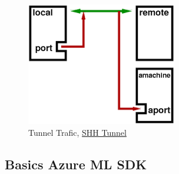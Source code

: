 \begin{figure}[H]
	\centering
	\includegraphics[scale = 0.3]{attachment/chapter_AML/Scc010}
	\caption{Tunnel Trafic, \href{https://radcamp.github.io/AF-Biota/Jupyter_Notebook_Setup.html}{SHH Tunnel}}
\end{figure}


\subsection{Basics Azure ML SDK}

